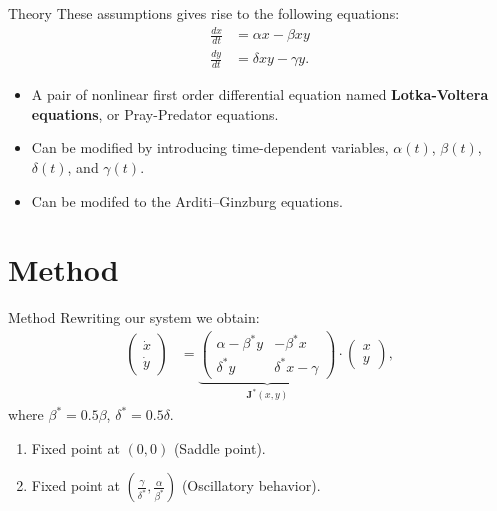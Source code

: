\documentclass{beamer}
\begin{document}
\begin{frame}{Theory}
	These assumptions gives rise to the following equations:
	\begin{align}
	    \frac{dx}{dt} &= \alpha x - \beta xy \nonumber\\
	    \frac{dy}{dt} &= \delta xy - \gamma y.\label{eq: lv}
	\end{align}
	\begin{itemize}
		\item<2->A pair of nonlinear first order differential equation named \textbf{Lotka-Voltera equations}, or Pray-Predator equations.
		\item<3->Can be modified by introducing time-dependent variables, $\alpha(t)$, $\beta(t)$, $\delta(t)$, and $\gamma(t)$.
		\item<4->Can be modifed to the Arditi–Ginzburg equations.
	\end{itemize}
\end{frame}

\section{Method}

\begin{frame}{Method}
	Rewriting our system we obtain:
	\begin{align}
	    \begin{pmatrix}
	        \dot{x}\\
	        \dot{y}
	    \end{pmatrix} &= \underbrace{\begin{pmatrix}
	        \alpha - \beta^* y & - \beta^* x \\
	        \delta^* y & \delta^* x - \gamma       
	    \end{pmatrix}}_{\mathbf{J}^*(x, y)}\cdot\begin{pmatrix}
	        x\\
	        y
	    \end{pmatrix},
	\end{align}
	where $\beta^* = 0.5\beta$, $\delta^* = 0.5\delta$.
	\begin{enumerate}
		\item<2-> Fixed point at $(0,0)$ (Saddle point).
		\item<3-> Fixed point at $\left(\frac{\gamma}{\delta^*}, \frac{\alpha}{\beta^*}\right)$ (Oscillatory behavior).
	\end{enumerate}

\end{frame}
\end{document}

